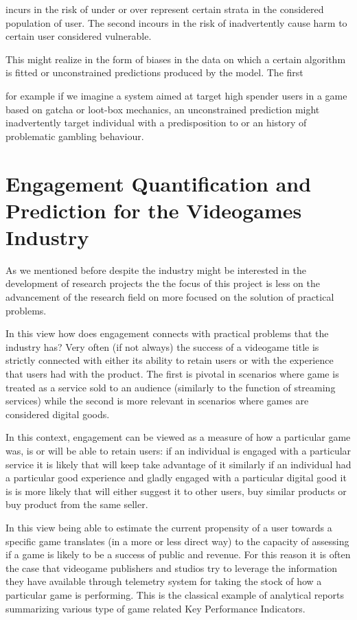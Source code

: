 incurs in the risk of  under or over represent certain strata in the considered population of user. The second incours in the risk of inadvertently cause harm to certain user considered vulnerable.

This might realize in the form of biases in the data on which a certain algorithm is fitted or unconstrained predictions produced by the model. The first 

for example if we imagine a system aimed at target high spender users in a game based on gatcha or loot-box mechanics, an unconstrained prediction might inadvertently target individual with a predisposition to or an history of problematic gambling behaviour.

\section{Engagement Quantification and Prediction for the Videogames Industry}
\label{industry_needs}
As we mentioned before despite the industry might be interested in the development of research projects the the focus of this project is less on the advancement of the research field on more focused on the solution of practical problems. 

In this view how does engagement connects with practical problems that the industry has? Very often (if not always) the success of a videogame title is strictly connected with either its ability to retain users or with the experience that users had with the product. The first is pivotal in scenarios where game is treated as a service sold to an audience (similarly to the function of streaming services) while the second is more relevant in scenarios where games are considered digital goods. 

In this context, engagement can be viewed as a measure of how a particular game was, is or will be able to retain users: if an individual is engaged with a particular service it is likely that will keep take advantage of it similarly if an individual had a particular good experience and gladly engaged with a particular digital good it is is more likely that will either suggest it to other users, buy similar products or buy product from the same seller.  

In this view being able to estimate the current propensity of a user towards a specific game translates (in a more or less direct way) to the capacity of assessing if a game is likely to be a success of public and revenue. For this reason it is often the case that videogame publishers and studios try to leverage the information they have available through telemetry system for taking the stock of how a particular game is performing. This is the classical example of analytical reports summarizing various type of game related Key Performance Indicators. 

